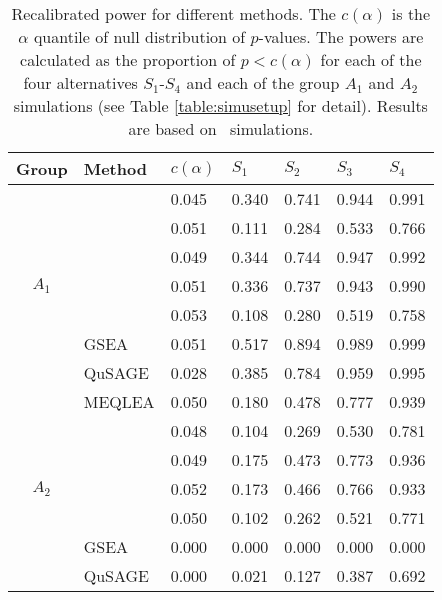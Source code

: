 	\begin{table}[!ht]
		\centering
		\caption[Recalibrated power for different methods]{Recalibrated power for different 
		methods. The $c(\alpha)$ is the $\alpha$ quantile of null distribution of $p$-values. The 
		powers are calculated as the proportion of $p<c(\alpha)$ for each of the four alternatives 
		$S_1$-$S_4$ and each of the group $A_1$ and $A_2$ simulations (see Table 
		\ref{table:simusetup} for detail). Results are based on \HowmanySimu~simulations.
		}\label{table:power}
		\begin{tabular}{cp{3cm}p{1.5cm}p{1.5cm}p{1.5cm}p{1.5cm}p{1.5cm}}
			\hline
			Group & Method &$c(\alpha)$	& $S_1$ & $S_2$ & $S_3$	&$S_4$  \\ 
			\hline
			\multirow{7}{*}{$A_1$} & \OurMethod & 0.045 & 0.340 & 0.741 & 0.944 & 0.991 \\ 
			&	\genr  & 0.051 & 0.111 & 0.284 & 0.533 & 0.766 \\ 
			&	\gent & 0.049 & 0.344 & 0.744 & 0.947 & 0.992 \\ 
			&	\CMT  & 0.051 & 0.336 & 0.737 & 0.943 & 0.990 \\ 
			&	\CMR  & 0.053 & 0.108 & 0.280 & 0.519 & 0.758 \\ 
			&	GSEA & 0.051 & 0.517 & 0.894 & 0.989 & 0.999 \\ 
			&	QuSAGE & 0.028 & 0.385 & 0.784 & 0.959 & 0.995 \\ 
		\hline
			\multirow{7}{*}{$A_2$} &	MEQLEA & 0.050 & 0.180 & 0.478 & 0.777 & 0.939 \\ 
			&		\genr & 0.048 & 0.104 & 0.269 & 0.530 & 0.781 \\ 
			&		\gent & 0.049 & 0.175 & 0.473 & 0.773 & 0.936 \\  
			&		\CMT & 0.052 & 0.173 & 0.466 & 0.766 & 0.933 \\ 
			&		\CMR & 0.050 & 0.102 & 0.262 & 0.521 & 0.771 \\ 
			&		GSEA & 0.000 & 0.000 & 0.000 & 0.000 & 0.000 \\ 
			&		QuSAGE  & 0.000 & 0.021 & 0.127 & 0.387 & 0.692 \\ 
		\hline
		\end{tabular}
	\end{table}
	
	
	
